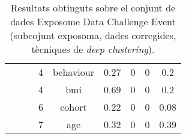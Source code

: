 \documentclass[CAT,BIB]{TFUOC}%
\begin{document}
\begin{table}
\begin{tabular}{@{}ccccccccc@{}}
            &  &  & 4 & behaviour & 0.27 & 0 & 0 & 0.2 \\
            &  &  & 4 & bmi & 0.69 & 0 & 0 & 0.2 \\
            &  &  & 6 & cohort & 0.22 & 0 & 0 & 0.08 \\
            &  &  & 7 & age & 0.32 & 0 & 0 & 0.39 \\ \bottomrule
        \end{tabular}
        \caption[Exposome Data Challenge Event: resultats - part 10]{
            Resultats obtinguts sobre el conjunt de dades Exposome Data Challenge Event
            (subcojunt exposoma, dades corregides, tècniques de \textit{deep clustering}).
        }
        \label{t:results_exposome10}
    \end{table}
\end{document}
